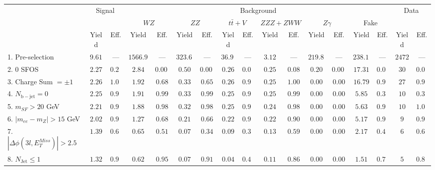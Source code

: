 \begin{tabular}{l||c|c||c|c||c|c||c|c||c|c||c|c||c|c||c|c}
\hline
 &                 \multicolumn{2}{c||}{Signal}            &  \multicolumn{12}{c||}{Background} &  \multicolumn{2}{c}{Data} \\
 & &  & \multicolumn{2}{c||}{$WZ$} & \multicolumn{2}{c||}{$ZZ$} & \multicolumn{2}{c||}{$t\bar{t}+V$} & \multicolumn{2}{c||}{$ZZZ+ZWW$} & \multicolumn{2}{c||}{$Z\gamma$} & \multicolumn{2}{c||}{Fake} &  & \\ 
 & Yield & Eff. & Yield & Eff. & Yield & Eff. & Yield & Eff. & Yield & Eff. & Yield & Eff. & Yield & Eff. & Yield & Eff.\\
\hline\hline
1. Pre-selection &  $9.61$ & --- &  $1566.91$ & --- &  $323.60$ &  --- &  $36.93$ &  --- &  $3.12$ & --- &  $219.80$ &  --- &  $238.12$ &  --- & $2472$ &  --- \\ 
\hline
2. 0 SFOS &  $2.27$ &  $0.24$ &  $2.84$ &  $0.002$ &  $0.50$ &  $0.002$ &  $0.26$ &  $0.01$ &  $0.25$ &  $0.08$ &  $0.20$ &  $0.001$ &  $17.31$ &  $0.07$ & $30$ &  $0.01$\\ 
\hline
3. Charge Sum $= \pm 1$ &  $2.26$ &  $1.00$ &  $1.92$ &  $0.68$ &  $0.33$ &  $0.65$ &  $0.26$ &  $0.99$ &  $0.25$ &  $1.00$ &  $0.00$ &  $0.00$ &  $16.79$ &  $0.97$ & $27$ &  $0.90$\\ 
\hline
4. $N_{\mathrm{b-jet}} = 0$ &  $2.25$ &  $0.99$ &  $1.91$ &  $0.99$ &  $0.33$ &  $0.99$ &  $0.25$ &  $0.98$ &  $0.25$ &  $0.99$ &  $0.00$ &  $0.00$ &  $5.85$ &  $0.35$ & $10$ &  $0.37$\\ 
\hline
5. $m_{SF} > 20$ GeV &  $2.21$ &  $0.98$ &  $1.88$ &  $0.98$ &  $0.32$ &  $0.98$ &  $0.25$ &  $0.98$ &  $0.24$ &  $0.98$ &  $0.00$ &  $0.00$ &  $5.63$ &  $0.96$ & $10$ &  $1.00$\\ 
\hline
6. $|m_{ee} - m_{Z}| > 15$ GeV &  $2.02$ &  $0.91$ &  $1.27$ &  $0.68$ &  $0.21$ &  $0.66$ &  $0.22$ &  $0.90$ &  $0.22$ &  $0.90$ &  $0.00$ &  $0.00$ &  $5.17$ &  $0.92$ & $9$ &  $0.90$\\ 
\hline
7. $|\Delta\phi(3l,E_{T}^{Miss})| > 2.5$ &  $1.39$ &  $0.69$ &  $0.65$ &  $0.51$ &  $0.07$ &  $0.34$ &  $0.09$ &  $0.38$ &  $0.13$ &  $0.59$ &  $0.00$ &  $0.00$ &  $2.17$ &  $0.42$ & $6$ &  $0.67$\\ 
\hline
8. $N_{\mathrm{Jet}} \leq 1$ &  $1.32$ &  $0.95$ &  $0.62$ &  $0.95$ &  $0.07$ &  $0.91$ &  $0.04$ &  $0.45$ &  $0.11$ &  $0.86$ &  $0.00$ &  $0.00$ &  $1.51$ &  $0.70$ & $5$ &  $0.83$\\ 
\hline
\end{tabular}



